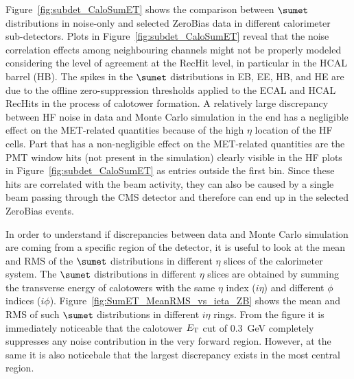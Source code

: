 Figure~\ref{fig:subdet_CaloSumET} shows the comparison between $\sumet$ distributions in noise-only
and selected ZeroBias data in different calorimeter sub-detectors. Plots in Figure~\ref{fig:subdet_CaloSumET} reveal that the noise correlation
effects among neighbouring channels might not be properly modeled considering the level of agreement at the RecHit level, in particular in the
HCAL barrel (HB). The spikes in the $\sumet$ distributions in EB, EE, HB, and HE are due to the offline zero-suppression
thresholds applied to the ECAL and HCAL RecHits in the process of calotower formation. A relatively large discrepancy between HF noise in data and
Monte Carlo simulation in the end has a negligible effect on the MET-related quantities 
because of the high $\eta$ location of the HF cells. Part that has a non-negligible effect on the MET-related quantities are the PMT window hits
(not present in the simulation) clearly visible in the HF plots in Figure~\ref{fig:subdet_CaloSumET} as entries outside the first bin. Since these
hits are correlated with the beam activity, they can also be caused by a single beam passing through the CMS detector and therefore can end up
in the selected ZeroBias events.

In order to understand if discrepancies between data and Monte Carlo simulation are coming from a specific region of the detector, it is useful to
look at the mean and RMS of the $\sumet$ distributions in different $\eta$ slices of the calorimeter system. The $\sumet$ distributions in different
$\eta$ slices are obtained
by summing the transverse energy of calotowers with the same $\eta$ index ($i\eta$) and different $\phi$ indices ($i\phi$).
Figure~\ref{fig:SumET_MeanRMS_vs_ieta_ZB} shows the mean and RMS of such $\sumet$ distributions in different $i\eta$ rings. From the figure it is
immediately noticeable that the calotower $E_{\rm T}$ cut of $0.3$~GeV completely suppresses any noise contribution in the very forward region.
However, at the same it is also noticebale that the largest discrepancy exists in the most central region.



